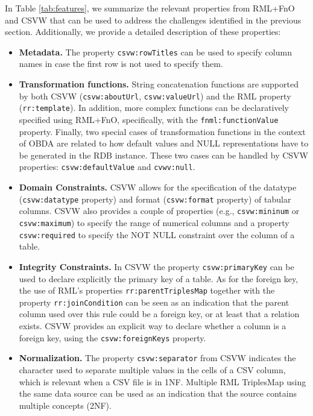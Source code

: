 In Table \ref{tab:features}, we summarize the relevant properties from RML+FnO and CSVW that can be used to address the  challenges identified in the previous section. Additionally, we provide a detailed description of these properties:
\begin{itemize}
    \item \textbf{Metadata.} The property \texttt{csvw:rowTitles} can be used to specify column names in case the first row is not used to specify them.
    
    \item \textbf{Transformation functions.} String concatenation functions are supported by both CSVW (\texttt{csvw:aboutUrl}, \texttt{csvw:valueUrl}) and the RML property (\texttt{rr:template}). In addition, more complex functions can be declaratively specified using RML+FnO, specifically, with the \texttt{fnml:functionValue} property. Finally, two special cases of transformation functions in the context of OBDA are related to how default values and NULL representations have to be generated in the RDB instance. These two cases can be handled by CSVW properties: \texttt{csvw:defaultValue} and \texttt{cvwv:null}.
    
    \item \textbf{Domain Constraints.} CSVW allows for the specification of the datatype (\texttt{csvw:datatype} property) and format (\texttt{csvw:format} property) of tabular columns. CSVW also provides a couple of properties (e.g., \texttt{csvw:mininum} or \texttt{csvw:maximum}) to specify the range of numerical columns and a property \texttt{csvw:required} to specify the NOT NULL constraint over the column of a table.
    
    \item \textbf{Integrity Constraints.} In CSVW the property \texttt{csvw:primaryKey} can be used to declare explicitly the primary key of a table. As for the foreign key, the use of RML's properties \texttt{rr:parentTriplesMap} together with the property \texttt{rr:joinCondition} can be seen as an indication that the parent column used over this rule could be a foreign key, or at least that a relation exists. CSVW provides an explicit way to declare whether a column is a foreign key, using the \texttt{csvw:foreignKeys} property. 
    
    \item \textbf{Normalization.} The property \texttt{csvw:separator} from CSVW indicates the character used to separate multiple values in the cells of a CSV column, which is relevant when a CSV file is in 1NF. Multiple RML TriplesMap using the same data source can be used as an indication that the source contains multiple concepts (2NF).
\end{itemize}



